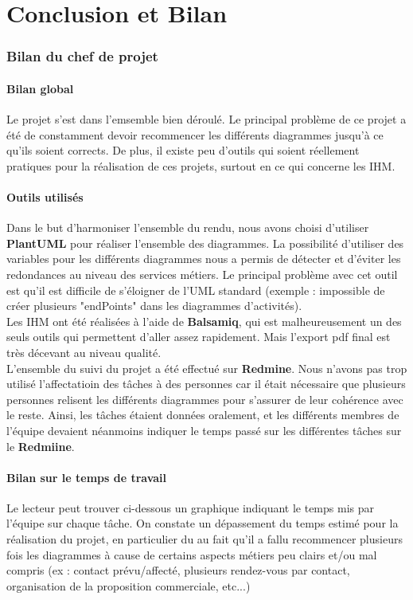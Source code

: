 \part{Conclusion et Bilan}
\setcounter{section}{0}

\section{Bilan du chef de projet}

\subsection{Bilan global}
Le projet s'est dans l'emsemble bien déroulé. Le principal problème de ce projet a été de constamment devoir recommencer les différents diagrammes jusqu'à ce qu'ils soient corrects. De plus, il existe peu d'outils qui soient réellement pratiques pour la réalisation de ces projets, surtout en ce qui concerne les IHM.

\subsection{Outils utilisés}
Dans le but d'harmoniser l'ensemble du rendu, nous avons choisi d'utiliser \textbf{PlantUML} pour réaliser l'ensemble des diagrammes. La possibilité d'utiliser des variables pour les différents diagrammes nous a permis de détecter et d'éviter les redondances au niveau des services métiers. Le principal problème avec cet outil est qu'il est difficile de s'éloigner de l'UML standard (exemple : impossible de créer plusieurs "endPoints" dans les diagrammes d'activités).\\

Les IHM ont été réalisées à l'aide de \textbf{Balsamiq}, qui est malheureusement un des seuls outils qui permettent d'aller assez rapidement. Mais l'export pdf final est très décevant au niveau qualité. \\

L'ensemble du suivi du projet a été effectué sur \textbf{Redmine}. Nous n'avons pas trop utilisé l'affectatioin des tâches à des personnes car il était nécessaire que plusieurs personnes relisent les différents diagrammes pour s'assurer de leur cohérence avec le reste. Ainsi, les tâches étaient données oralement, et les différents membres de l'équipe devaient néanmoins indiquer le temps passé sur les différentes tâches sur le \textbf{Redmiine}.

\subsection{Bilan sur le temps de travail}
Le lecteur peut trouver ci-dessous un graphique indiquant le temps mis par l'équipe sur chaque tâche.
On constate un dépassement du temps estimé pour la réalisation du projet, en particulier du au fait qu'il a fallu recommencer plusieurs fois les diagrammes à cause de certains aspects métiers peu clairs et/ou mal compris (ex : contact prévu/affecté, plusieurs rendez-vous par contact, organisation de la proposition commerciale, etc...)


